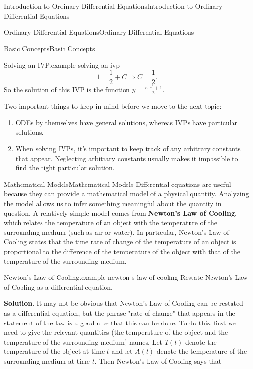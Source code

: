 \documentclass[10pt,]{book}
\newcommand{\terminology}[1]{\textbf{#1}}
\numberwithin{equation}{section}
\begin{document}
\begin{chapterptx}{Introduction to Ordinary Differential Equations}{}{Introduction to Ordinary Differential Equations}{}{}
\begin{sectionptx}{Ordinary Differential Equations}{}{Ordinary Differential Equations}{}{}
\begin{subsectionptx}{Basic Concepts}{}{Basic Concepts}{}{}
\begin{example}{Solving an IVP.}{example-solving-an-ivp}
\begin{equation*}
1 = \frac{1}{2} + C \Rightarrow C = \frac{1}{2}.
\end{equation*}
So the solution of this IVP is the function \(y = \frac{e^{-x^{2}}+1}{2}\).%
\end{example}
\hypertarget{p-23}{}%
Two important things to keep in mind before we move to the next topic: \leavevmode%
\begin{enumerate}
\item\hypertarget{li-3}{}\hypertarget{p-24}{}%
ODEs by themselves have general solutions, whereas IVPs have particular solutions.%
\item\hypertarget{li-4}{}\hypertarget{p-25}{}%
When solving IVPs, it's important to keep track of any arbitrary constants that appear. Neglecting arbitrary constants usually makes it impossible to find the right particular solution.%
\end{enumerate}
%
\end{subsectionptx}
%
%
\typeout{************************************************}
\typeout{************************************************}
%
\begin{subsectionptx}{Mathematical Models}{}{Mathematical Models}{}{}\label{subsection-mathematical-models}
\hypertarget{p-26}{}%
Differential equations are useful because they can provide a mathematical model of a physical quantity. Analyzing the model allows us to infer something meaningful about the quantity in question. A relatively simple model comes from \terminology{Newton's Law of Cooling}, which relates the temperature of an object with the temperature of the surrounding medium (such as air or water). In particular, Newton's Law of Cooling states that the time rate of change of the temperature of an object is proportional to the difference of the temperature of the object with that of the temperature of the surrounding medium.%
\begin{example}{Newton's Law of Cooling.}{example-newton-s-law-of-cooling}%
\hypertarget{p-27}{}%
Restate Newton's Law of Cooling as a differential equation.%
\par\smallskip%
\noindent\textbf{Solution}.\hypertarget{solution-4}{}\quad%
\hypertarget{p-28}{}%
It may not be obvious that Newton's Law of Cooling can be restated as a differential equation, but the phrase "rate of change" that appears in the statement of the law is a good clue that this can be done. To do this, first we need to give the relevant quantities (the temperature of the object and the temperature of the surrounding medium) names. Let \(T(t)\) denote the temperature of the object at time \(t\) and let \(A(t)\) denote the temperature of the surrounding medium at time \(t\). Then Newton's Law of Cooling says that%

\end{example}
\end{subsectionptx}
\end{sectionptx}
\end{chapterptx}
\end{document}
